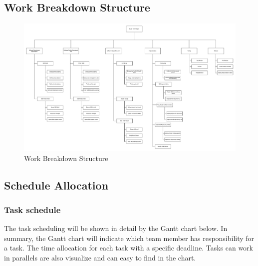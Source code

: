 	\subsection{Work Breakdown Structure}
	\begin{figure}[H]
		\centering
		\hspace*{-1.3in}
		\includegraphics[width=1.5\linewidth]{WorkBreakDown_s.PNG}  %
		\caption{Work Breakdown Structure}
		\label{work-breakdown-structure}
	\end{figure}
\subsection{Schedule Allocation}
\subsubsection{Task schedule}
The task scheduling will be shown in detail by the Gantt chart below. In summary, the Gantt chart will indicate which team member has responsibility for a task. The time allocation for each task with a specific  deadline. Tasks can work in parallels are also visualize and can easy to find in the chart.     
